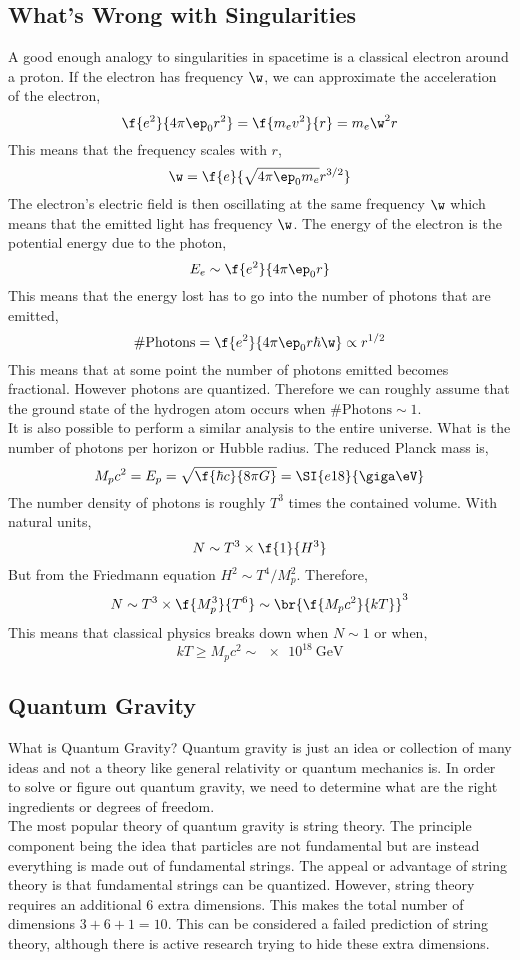 \documentclass{article}
\begin{document}
\subsection{What's Wrong with Singularities}

A good enough analogy to singularities in spacetime is a classical electron around a proton. If the electron has frequency $\w$, we can approximate the acceleration of the electron,
\[ \f{e^2}{4 \pi \ep_0 r^2} = \f{m_e v^2}{r} = m_e \w^2 r \]
This means that the frequency scales with $r$,
\[ \w = \f{e}{\sqrt{4 \pi \ep_0 m_e } r^{3/2}} \]
The electron's electric field is then oscillating at the same frequency $\w$ which means that the emitted light has frequency $\w$. The energy of the electron is the potential energy due to the photon,
\[ E_e \sim \f{e^2}{4 \pi \ep_0 r} \]
This means that the energy lost has to go into the number of photons that are emitted,
\[ \# \text{Photons} = \f{e^2}{4 \pi \ep_0 r \hbar \w} \propto r^{1/2} \]
This means that at some point the number of photons emitted becomes fractional. However photons are quantized. Therefore we can roughly assume that the ground state of the hydrogen atom occurs when $\# \text{Photons} \sim 1$. \\

It is also possible to perform a similar analysis to the entire universe. What is the number of photons per horizon or Hubble radius. The reduced Planck mass is,
\[ M_p c^2 = E_p = \sqrt{\f{\hbar c}{8 \pi G}} = \SI{e18}{\giga \eV} \]
The number density of photons is roughly $T^3$ times the contained volume. With natural units,
\[ N \sim T^3 \times \f{1}{H^3} \]
But from the Friedmann equation $H^2 \sim T^4 / M_p^2$. Therefore,
\[ N \sim T^3 \times \f{M_p^3}{T^6} \sim \br{\f{M_p c^2}{k T}}^3 \]
This means that classical physics breaks down when $N \sim 1$ or when,
\[ kT \geq M_p c^2 \sim \SI{e18}{\giga \eV} \]

\subsection{Quantum Gravity}

What is Quantum Gravity? Quantum gravity is just an idea or collection of many ideas and not a theory like general relativity or quantum mechanics is. In order to solve or figure out quantum gravity, we need to determine what are the right ingredients or degrees of freedom. \\

The most popular theory of quantum gravity is string theory. The principle component being the idea that particles are not fundamental but are instead everything is made out of fundamental strings. The appeal or advantage of string theory is that fundamental strings can be quantized. However, string theory requires an additional $6$ extra dimensions. This makes the total number of dimensions $3 + 6 + 1 = 10$. This can be considered a failed prediction of string theory, although there is active research trying to hide these extra dimensions.\\
\end{document}
